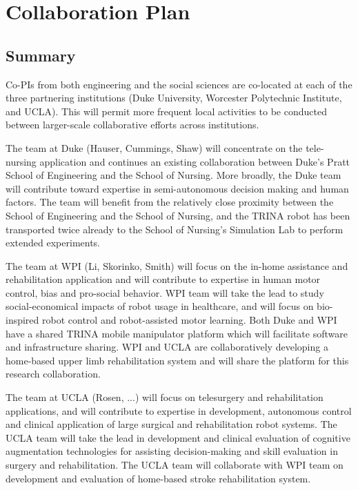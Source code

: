 \pagebreak
\setcounter{page}{1}
\setcounter{section}{0}

\section{Collaboration Plan}

\subsection{Summary}

Co-PIs from both engineering and the social sciences are co-located at each of the three partnering institutions (Duke University, Worcester Polytechnic Institute, and UCLA).  This will permit more frequent local activities to be conducted between larger-scale collaborative efforts across institutions.

The team at Duke (Hauser, Cummings, Shaw) will concentrate on the tele-nursing application and continues an existing collaboration between Duke’s Pratt School of Engineering and the School of Nursing. More broadly, the Duke team will contribute toward expertise in semi-autonomous decision making and human factors. The team will benefit from the relatively close proximity between the School of Engineering and the School of Nursing, and the TRINA robot has been transported twice already to the School of Nursing’s Simulation Lab to perform extended experiments.

The team at WPI (Li, Skorinko, Smith) will focus on the in-home assistance and rehabilitation application and will contribute to expertise in human motor control, bias and pro-social behavior.  WPI team will take the lead to study social-economical impacts of robot usage in healthcare, and will focus on bio-inspired robot control and robot-assisted motor learning.  Both Duke and WPI have a shared TRINA mobile manipulator platform which will facilitate software and infrastructure sharing. WPI and UCLA are collaboratively developing a home-based upper limb rehabilitation system and will share the platform for this research collaboration. 

The team at UCLA (Rosen, ...) will focus on telesurgery and rehabilitation applications, and will contribute to expertise in development, autonomous control and clinical application of large surgical and rehabilitation robot systems. The UCLA team will take the lead in development and clinical evaluation of cognitive augmentation technologies for assisting decision-making and skill evaluation in surgery and rehabilitation. The UCLA team will collaborate with WPI team on development and evaluation of home-based stroke rehabilitation system. 


